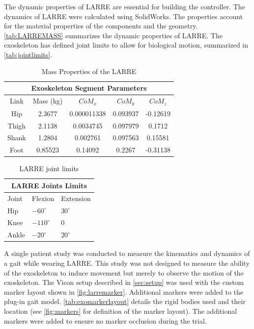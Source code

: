 The dynamic properties of LARRE are essential for building the controller. The dynamics of LARRE were calculated using SolidWorks. The properties account for the material properties of the components and the geometry. \autoref{tab:LARREMASS} summarizes the dynamic properties of LARRE. The exoskeleton has defined joint limits to allow for biological motion, summarized in \autoref{tab:jointlimits}.

\begin{table}[h!]
    \centering
    \begin{tabular}{|c c c c c|}  
         \hline 
          \multicolumn{5}{|c|}{Exoskeleton Segment Parameters} \\
         \hline
         Link & Mass (kg) & $CoM_x$ & $CoM_y$ & $CoM_z$ \\
         \hline \hline
         Hip & 2.3677 & 0.000011338 & 0.093937 &  -0.12619 \\
         Thigh & 2.1138 & 0.0034745   & 0.097979 &  0.1712 \\
         Shank & 1.2804  &   0.002761 & 0.097563   & 0.15581\\
         Foot & 0.85523 & 0.14092 & 0.2267 &  -0.31138  \\
         \hline
    \end{tabular}    
    \caption[Dynamic Properties of the LARRE]{Mass Properties of the LARRE}
    \label{tab:LARREMASS}
\end{table}


\begin{table}[h!]
\begin{centering}
    \begin{tabular}{ |p{1cm} p{2cm} p{2cm} |  }
        \hline 
        \multicolumn{3}{|c|}{LARRE Joints Limits} \\
        \hline 
        Joint & Flexion & Extension \\
        \hline \hline
        Hip   & $-60^{\circ}$   & $30^{\circ}$  \\
        Knee &   $-110^{\circ}$  & $0$   \\
        Ankle & $-20^{\circ}$ & $20^{\circ}$  \\
        \hline
    \end{tabular}
    \caption[LARRE Joint Limits]{LARRE joint limits}    \centering
    \label{tab:jointlimits}
\end{centering}
\end{table}


A single patient study was conducted to measure the kinematics and dynamics of a gait while wearing LARRE. This study was not designed to measure the ability of the exoskeleton to induce movement but merely to observe the motion of the exoskeleton. The Vicon setup described in \autoref{sec:setup} was used with the custom marker layout shown in \autoref{fig:larremarker}. Additional markers were added to the plug-in gait model. \autoref{tab:exomarkerlayout} details the rigid bodies used and their location (see \autoref{fig:markers} for definition of the marker layout). The additional markers were added to ensure no marker occlusion during the trial. 



